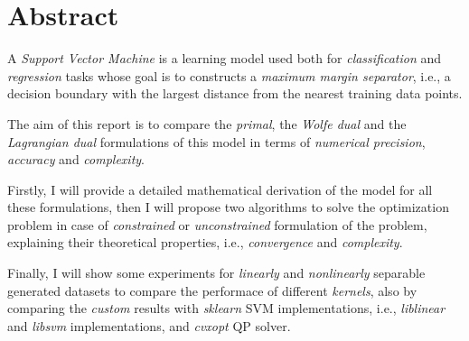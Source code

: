 \section{Abstract}

A \emph{Support Vector Machine} is a learning model used both for \emph{classification} and \emph{regression} tasks whose goal is to constructs a \emph{maximum margin separator}, i.e., a decision boundary with the largest distance from the nearest training data points.

The aim of this report is to compare the \emph{primal}, the \emph{Wolfe dual} and the \emph{Lagrangian dual} formulations of this model in terms of \emph{numerical precision}, \emph{accuracy} and \emph{complexity}.

Firstly, I will provide a detailed mathematical derivation of the model for all these formulations, then I will propose two algorithms to solve the optimization problem in case of \emph{constrained} or \emph{unconstrained} formulation of the problem, explaining their theoretical properties, i.e., \emph{convergence} and \emph{complexity}.

Finally, I will show some experiments for \emph{linearly} and \emph{nonlinearly} separable generated datasets to compare the performace of different \emph{kernels}, also by comparing the \emph{custom} results with \emph{sklearn} SVM implementations, i.e., \emph{liblinear} and \emph{libsvm} implementations, and \emph{cvxopt} QP solver.
